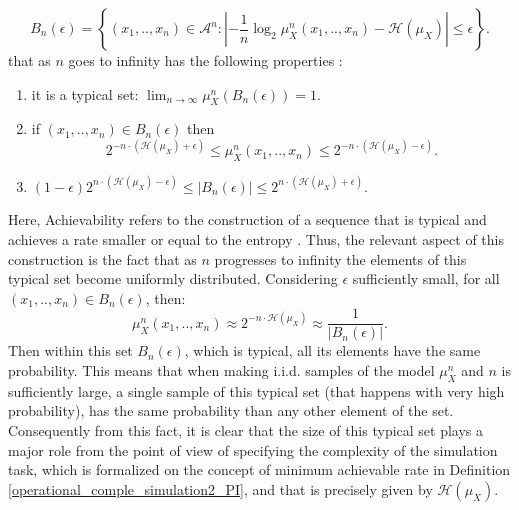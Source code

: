 \begin{enumerate}
\begin{equation}
	B_n(\epsilon)=\left\{ (x_1,..,x_n)\in \mathcal{A}^n: \left| -\frac{1}{n} \log_2 \mu^n_X(x_1,..,x_n) - \mathcal{H}(\mu_X) \right| \leq \epsilon \right\}.
\end{equation}
that as $n$ goes to infinity has the following properties \citep{cover_2006}:
\begin{enumerate}
	\item it is a typical set:  $\lim_{n \rightarrow \infty} \mu_X^n(B_n(\epsilon))=1$. 
	\item if $(x_1,..,x_n) \in B_n(\epsilon)$ then 
	$$2^{-n\cdot (\mathcal{H}(\mu_X)+\epsilon)} \leq \mu^n_X(x_1,..,x_n) \leq 2^{-n\cdot (\mathcal{H}(\mu_X)-\epsilon)}.$$
	\item $(1-\epsilon) 2^{n\cdot (\mathcal{H}(\mu_X) -\epsilon)} \leq \left| B_n(\epsilon) \right| \leq 2^{n\cdot (\mathcal{H}(\mu_X) +\epsilon)}$.
\end{enumerate}
{Here, Achievability refers to the construction of a sequence that is typical and achieves a rate smaller or equal to the entropy \citep{cover_2006}.}
Thus, the relevant aspect of this construction is the fact that as $n$ progresses to infinity the elements of this typical set become uniformly distributed. Considering $\epsilon$ sufficiently small, for all $(x_1,..,x_n)\in B_n(\epsilon)$, then: $$\mu^n_X(x_1,..,x_n)\approx 2^{-n\cdot \mathcal{H}(\mu_X)}  \approx \frac{1}{ \left| B_n(\epsilon) \right|}.$$ 
Then within this  set $B_n(\epsilon)$,  which is typical, all its elements have the same probability. This means that when making i.i.d. samples of the model $\mu^n_X$ and $n$ is sufficiently large, a single sample of this typical set (that happens with very high probability), %
has the same probability than any other element of the set. Consequently from this fact, it is clear that the size of this typical set plays a major role from the point of view of specifying the complexity of the simulation task, which is formalized on the concept of minimum achievable rate in Definition \ref{operational_comple_simulation2_PI}, and that is precisely given by $\mathcal{H}(\mu_X)$.
\end{enumerate}








